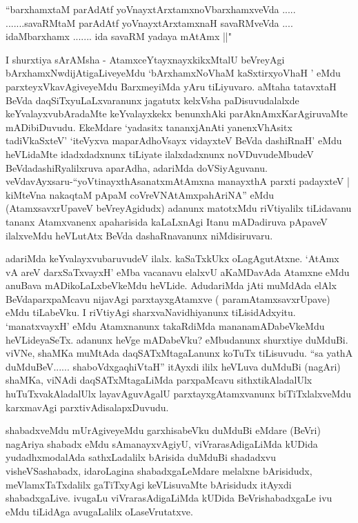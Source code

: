 \begin{shl}
``barxhamxtaM parAdAtf yoV\s nayxtArxtamxnoVbarxhamxveVda .....
.......savaRMtaM parAdAtf yoV\s nayxtArxtamxnaH savaRMveVda ....
idaMbarxhamx ....... ida savaRM yadaya mAtAmx ||"
\end{shl}

\begin{artha}
I shurxtiya sArAMsha - AtamxceYtayxnayxkikxMtalU beVreyAgi
bArxhamxNwdijAtigaLive\-yeMdu `bArxhamxNoV\s haM kaSxtirxyoV\s haH	' eMdu parxteyxVkavAgiveyeMdu
\break BarxmeyiMda yAru tiLiyuvaro. aMtaha tatavxtaH BeVda
daqSiTxyuLaLxvaranunx \-jagatutx kelxVsha paDisuvudalalxde
keYvalayxvubAradaMte keYvalayxkekx benunxhAki parAknAmxKarAgiru\-vaMte
mADibiDuvudu. EkeMdare `yadasitx tananxjAnAti yanenxVhAsitx tadiVkaSxteV' `iteVyxva maparAdhoV\s sayx vidayxteV BeVda dashiRnaH' eMdu heVLidaMte idadxdadxnunx
tiLiyate ilalxdadxnunx noVDuvudeMbudeV BeVdadashiRyalilxruva aparAdha,
adariMda doVSiyAguvanu. veVdavAyxsaru-``yoVtinayxthAsanatxmAtAmxna manayxthA parxti \-padayxteV | kiMteVna nakaqtaM pApaM coVreVNAtAmxpahAriNA'' eMdu (AtamxsavxrUpaveV
beVre\-yAgidudx) adanunx matotxMdu riVtiyalilx tiLidavanu tananx
Atamxvanenx apaharisida kaLaLxnAgi Itanu mADadiruva pApaveV ilalxveMdu
heVLutAtx BeVda dashaRnavanunx niMdisiruvaru.

adariMda keYvalayxvubaruvudeV ilalx. kaSaTxkUkx
oLagAgutAtxne. `AtAmx vA areV darxSaTxvayxH' eMba vacanavu elalxvU aKaMDavAda Atamxne eMdu
anuBava mADikoLaLxbeVkeMdu heVLide. AdudariMda jAti muMdAda elAlx
BeVdaparxpaMcavu nijavAgi parxtayxgAtamxve ( paramAtamxsavxrUpave)
eMdu tiLabeVku. I riVtiyAgi sharxvaNavidhiyanunx
tiLisidAdxyitu. `manatxvayxH' eMdu Atamxnanunx takaRdiMda
mananamADabeVkeMdu heVLideyaSeTx. adanunx heVge mADabeVku? eMbudanunx
shurxtiye duMduBi. viVNe, shaMKa muMtAda daqSATxMtagaLanunx koTuTx
tiLisuvudu. ``sa yathA duMduBeV...... shaboVdxgaqhiVtaH'' itAyxdi ililx heVLuva duMduBi (nagAri) shaMKa, viNAdi
daqSATxMtagaLiMda parxpaMcavu sithxtikAladalUlx huTuTxvakAladalUlx
layavAguvAgalU parxtayxgAtamxvanunx biTiTxlalxveMdu karxmavAgi
parxtivAdisalapxDuvudu. 

shabadxveMdu mUrAgiveyeMdu garxhisabeVku duMduBi eMdare (BeVri)
\break nagAriya shabadx eMdu sAmanayxvAgiyU, viVrarasAdigaLiMda kUDida
yudadhx\-modalAda sathxLadalilx bArisida duMduBi shadadxvu
visheVSashabadx, idaroLagina shabadx\-gaLeMdare melalxne bArisidudx,
meVlamxTaTxdalilx gaTiTxyAgi keVLisuvaMte bArisidudx itAyxdi
shabadxgaLive. ivugaLu viVrarasAdigaLiMda kUDida BeVrishabadxgaLe ivu
eMdu tiLidAga avugaLalilx oLaseVrutatxve.


\end{artha}
